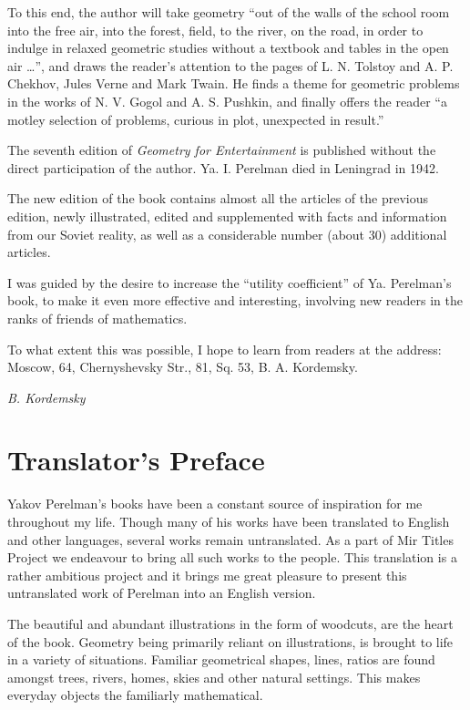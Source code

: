 {To this end, the author will take geometry ``out of the walls of the school room into the free air, into the forest, field, to the river, on the road, in order to indulge in relaxed geometric studies without a textbook and tables in the open air \ldots{}'', and draws the reader's attention to the pages of L. N. Tolstoy and A. P. Chekhov, Jules Verne and Mark Twain. He finds a theme for geometric problems in the works of N. V. Gogol and A. S. Pushkin, and finally offers the reader ``a motley selection of problems, curious in plot, unexpected in result.''

The seventh edition of \emph{Geometry for Entertainment} is published without the direct participation of the author. Ya. I. Perelman died in Leningrad in 1942.

The new edition of the book contains almost all the articles of the previous edition, newly illustrated, edited and supplemented with facts and information from our Soviet reality, as well as a considerable number (about 30) additional articles.

I was guided by the desire to increase the ``utility coefficient'' of Ya. Perelman's book, to make it even more effective and interesting, involving new readers in the ranks of friends of mathematics.

To what extent this was possible, I hope to learn from readers at the address: Moscow, 64, Chernyshevsky Str., 81, Sq. 53, B. A. Kordemsky.


\begin{flushright}
\emph{B. Kordemsky}
\end{flushright}


\chapter{Translator's Preface}
\label{translator-preface}

Yakov Perelman's books have been a constant source of inspiration for me throughout my life. Though many of his works have been translated to English and other languages, several works remain untranslated. As a part of Mir Titles Project we endeavour to bring all such works to the people. This translation is a rather ambitious project and it brings me great pleasure to present this untranslated work of Perelman into an English version. 

The beautiful and abundant illustrations in the form of woodcuts, are the heart of the book. Geometry being primarily reliant on illustrations, is brought to life in a variety of situations. Familiar geometrical shapes, lines, ratios are found amongst trees, rivers, homes, skies and other natural settings. This makes everyday objects the familiarly mathematical. 

}
